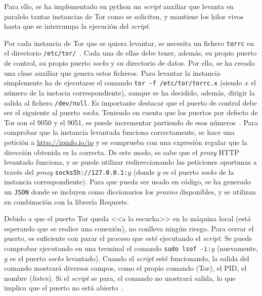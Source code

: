 Para ello, se ha implementado en python un \textit{script} auxiliar que levanta en paralelo tantas instancias de Tor como se soliciten, y mantiene los hilos vivos hasta que se interrumpa la ejecución del \textit{script}.

Por cada instancia de Tor que se quiera levantar, se necesita un fichero \texttt{torrc} en el directorio \texttt{/etc/tor/}~\cite{TorFicherosTor}. Cada una de ellas debe tener, además, su propio puerto de control, su propio puerto \textit{socks} y su directorio de datos. Por ello, se ha creado una clase auxiliar que genera estos ficheros. Para levantar la instancia simplemente ha de ejecutarse el comando \texttt{tor -f /etc/tor/torrc.x} (siendo $x$ el número de la instacia correspondiente), aunque se ha decidido, además, dirigir la salida al fichero \texttt{/dev/null}. Es importante destacar que el puerto de control debe ser el siguiente al puerto \textit{socks}. Teniendo en cuenta que los puertos por defecto de Tor son el 9050 y el 9051, se puede incrementar partiendo de esos números~\cite{TorficheroComando}. Para comprobar que la instancia levantada funciona correctamente, se hace una petición a \url{http://ipinfo.io/ip} y se comprueba con una expresión regular que la dirección obtenida es la correcta. De este modo, se sabe que el \textit{proxy} HTTP levantado funciona, y se puede utilizar redireccionando las peticiones oportunas a través del \textit{proxy} \texttt{socks5h://127.0.0.1:$y$} (donde $y$ es el puerto \textit{socks} de la instancia correspondiente). Para que pueda ser usado en código, se ha generado un \texttt{JSON} donde se incluyen como diccionarios los \textit{proxies} disponibles, y se utilizan en combinación con la librería Requests.

Debido a que el puerto Tor queda <<a la escucha>> en la máquina local (está esperando que se realice una conexión), no conlleva ningún riesgo. Para cerrar el puerto, es suficiente con parar el proceso que esté ejecutando el \textit{script}. Se puede comprobar ejecutando en una terminal el comando \texttt{sudo lsof -i:$y$} (nuevamente, $y$ es el puerto \textit{socks} levantado). Cuando el \textit{script} esté funcionando, la salida del comando mostrará diversos campos, como el propio comando (Tor), el PID, el nombre (\textit{listen}). Si el \textit{script} se para, el comando no mostrará salida, lo que implica que el puerto no está abierto~\cite{checkOpenTorPorts}.